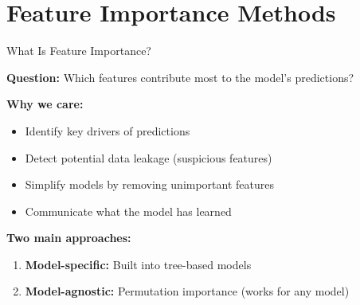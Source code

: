 \documentclass[10pt]{beamer}
\begin{document}
\section{Feature Importance Methods}

\begin{frame}{What Is Feature Importance?}

  \textbf{Question:} Which features contribute most to the model's predictions?

  \vspace{1em}
  \textbf{Why we care:}
  \begin{itemize}
    \item Identify key drivers of predictions
    \item Detect potential data leakage (suspicious features)
    \item Simplify models by removing unimportant features
    \item Communicate what the model has learned
  \end{itemize}

  \vspace{1em}
  \textbf{Two main approaches:}
  \begin{enumerate}
    \item \textbf{Model-specific:} Built into tree-based models
    \item \textbf{Model-agnostic:} Permutation importance (works for any model)
  \end{enumerate}
\end{frame}

\end{document}
